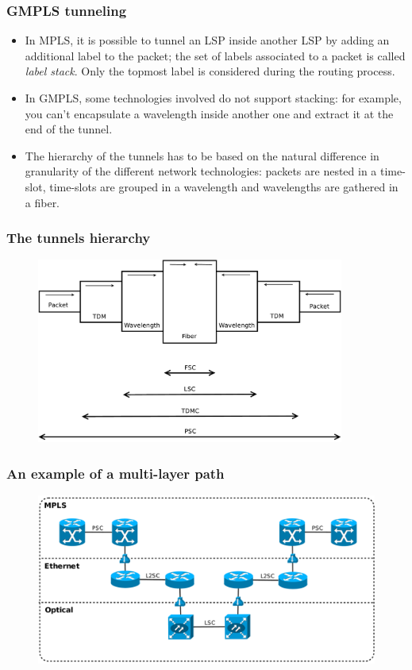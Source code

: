 \documentclass{beamer}
\begin{document}
\frame
{
  \frametitle{GMPLS tunneling}
  
  \begin{itemize}
  \item<1-> In MPLS, it is possible to tunnel an LSP inside another
    LSP by adding an additional label to the packet; the set of labels
    associated to a packet is called \textit{label stack}. Only the
    topmost label is considered during the routing process.
  \item<2-> In GMPLS, some technologies involved do not support
    stacking: for example, you can't encapsulate a wavelength inside
    another one and extract it at the end of the tunnel.
  \item<3-> The hierarchy of the tunnels has to be based on the
    natural difference in granularity of the different network
    technologies: packets are nested in a time-slot, time-slots are
    grouped in a wavelength and wavelengths are gathered in a fiber.
  \end{itemize}
}
\frame
{
  \frametitle{The tunnels hierarchy}

  \begin{figure}[!htbp]
    \centering
    \includegraphics[width=0.9\textwidth]{img/gmpls_hierarchy}
  \end{figure}
}
\frame
{
  \frametitle{An example of a multi-layer path}

  \begin{figure}[!htbp]
    \begin{center}
      \includegraphics[width=1\textwidth]{img/multi_path}
    \end{center}
  \end{figure}
}
\end{document}
